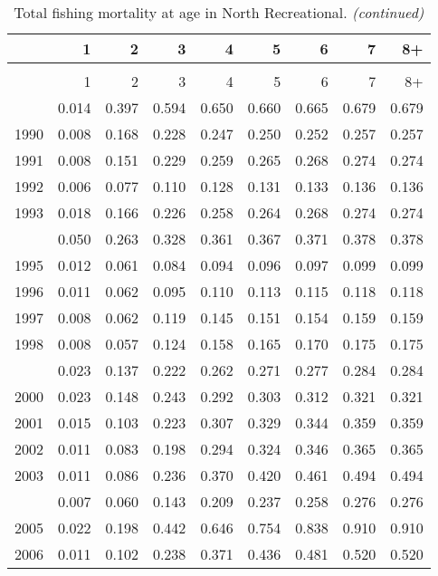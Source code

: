 \documentclass[
]{article}
\begin{document}
\begin{longtable}[t]{lrrrrrrrr}
\caption{\label{tab:North_Recreational-fleet-FAA-table}Total fishing mortality at age in North Recreational.}\\
\toprule
  & 1 & 2 & 3 & 4 & 5 & 6 & 7 & 8+\\
\midrule
\endfirsthead
\caption[]{Total fishing mortality at age in North Recreational. \textit{(continued)}}\\
\toprule
  & 1 & 2 & 3 & 4 & 5 & 6 & 7 & 8+\\
\midrule
\endhead

\endfoot
\bottomrule
\endlastfoot
1989 & 0.014 & 0.397 & 0.594 & 0.650 & 0.660 & 0.665 & 0.679 & 0.679\\
1990 & 0.008 & 0.168 & 0.228 & 0.247 & 0.250 & 0.252 & 0.257 & 0.257\\
1991 & 0.008 & 0.151 & 0.229 & 0.259 & 0.265 & 0.268 & 0.274 & 0.274\\
1992 & 0.006 & 0.077 & 0.110 & 0.128 & 0.131 & 0.133 & 0.136 & 0.136\\
1993 & 0.018 & 0.166 & 0.226 & 0.258 & 0.264 & 0.268 & 0.274 & 0.274\\
\addlinespace
1994 & 0.050 & 0.263 & 0.328 & 0.361 & 0.367 & 0.371 & 0.378 & 0.378\\
1995 & 0.012 & 0.061 & 0.084 & 0.094 & 0.096 & 0.097 & 0.099 & 0.099\\
1996 & 0.011 & 0.062 & 0.095 & 0.110 & 0.113 & 0.115 & 0.118 & 0.118\\
1997 & 0.008 & 0.062 & 0.119 & 0.145 & 0.151 & 0.154 & 0.159 & 0.159\\
1998 & 0.008 & 0.057 & 0.124 & 0.158 & 0.165 & 0.170 & 0.175 & 0.175\\
\addlinespace
1999 & 0.023 & 0.137 & 0.222 & 0.262 & 0.271 & 0.277 & 0.284 & 0.284\\
2000 & 0.023 & 0.148 & 0.243 & 0.292 & 0.303 & 0.312 & 0.321 & 0.321\\
2001 & 0.015 & 0.103 & 0.223 & 0.307 & 0.329 & 0.344 & 0.359 & 0.359\\
2002 & 0.011 & 0.083 & 0.198 & 0.294 & 0.324 & 0.346 & 0.365 & 0.365\\
2003 & 0.011 & 0.086 & 0.236 & 0.370 & 0.420 & 0.461 & 0.494 & 0.494\\
\addlinespace
2004 & 0.007 & 0.060 & 0.143 & 0.209 & 0.237 & 0.258 & 0.276 & 0.276\\
2005 & 0.022 & 0.198 & 0.442 & 0.646 & 0.754 & 0.838 & 0.910 & 0.910\\
2006 & 0.011 & 0.102 & 0.238 & 0.371 & 0.436 & 0.481 & 0.520 & 0.520\\

\end{longtable}
\end{document}
